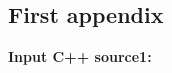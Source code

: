 \documentclass[12pt,a4paper]{article}
\theoremstyle{definition}
\begin{document}
\newpage

\begin{appendices}
\section{First appendix}
\textcolor[rgb]{0.98,0.00,0.00}{\textbf{Input C++ source1:}}




%

\end{appendices}
\end{document}
